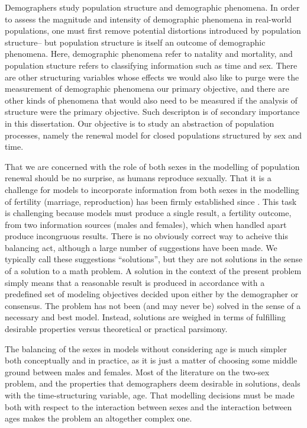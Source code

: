 Demographers study population structure and demographic phenomena. In order
to assess the magnitude and intensity of demographic phenomena in real-world
populations, one must first remove potential distortions introduced by
population structure-- but population structure is itself an outcome
of demographic phenomena. Here, demographic phenomena refer to natality and
mortality, and population stucture refers to classifying information such as
time and sex. There are other structuring variables whose effects we would also
like to purge were the measurement of demographic phenomena 
our primary objective, and there are other kinds of phenomena that would also
need to be measured if the analysis of structure were the primary
objective. Such descripton is of secondary importance in this dissertation. Our
objective is to study an abstraction of population processes, namely the 
renewal model for closed populations structured by sex and time.

That we are concerned with the role of both sexes in the modelling of population
renewal should be no surprise, as humans reproduce sexually. That it is a
challenge for models to incorporate information from both sexes in the modelling
of fertility (marriage, reproduction) has been firmly established since
\citet{karmel1947relations}. This task is challenging because models must
produce a single result, a fertility outcome, from two information sources
(males and females), which when handled apart produce incongruous results. 
There is no obviously correct way to acheive this balancing act, although a large number of
suggestions have been made. We typically call these suggestions ``solutions'',
but they are not solutions in the sense of a solution to a math problem. A
solution in the context of the present problem simply means that a reasonable
result is produced in accordance with a predefined set of modeling objectives
decided upon either by the demographer or consensus. The problem has not been
(and may never be) solved in the sense of a necessary and best model. Instead,
solutions are weighed in terms of fulfilling desirable properties versus theoretical 
or practical parsimony.

The balancing of the sexes in models without considering age is
much simpler both conceptually and in practice, as it is just a matter of
choosing some middle ground between males and females. Most of the literature on
the two-sex problem, and the properties that demographers deem desirable in
solutions, deals with the time-structuring variable, age. That modelling
decisions must be made both with respect to the interaction between sexes and
the interaction between ages makes the problem an altogether complex one. 

